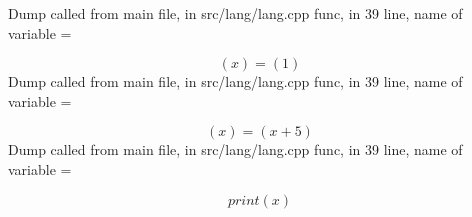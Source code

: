 \documentclass{article}
\begin{document}
Dump called from main file, in src/lang/lang.cpp func, in 39 line, name of variable = 


$$
(x) = (1)
$$
Dump called from main file, in src/lang/lang.cpp func, in 39 line, name of variable = 


$$
(x) = (x + 5)
$$
Dump called from main file, in src/lang/lang.cpp func, in 39 line, name of variable = 


$$
 print (x)
$$
\end{document}
